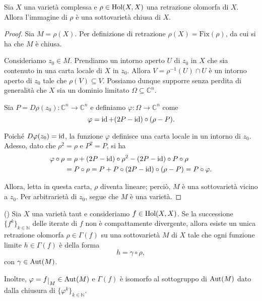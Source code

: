 \begin{lm}
    Sia $X$ una varietà complessa e $\rho\in\textnormal{Hol}(X,X)$ una retrazione olomorfa di $X$. Allora l'immagine di $\rho$ è una sottovarietà chiusa di $X$.
\end{lm}
\begin{proof}
    Sia $M=\rho(X)$. Per definizione di retrazione $\rho(X)=\text{Fix}(\rho)$, da cui si ha che $M$ è chiusa.
    
    Consideriamo $z_0 \in M$. Prendiamo un intorno aperto $U$ di $z_0$ in $X$ che sia contenuto in una carta locale di $X$ in $z_0$. Allora $V=\rho^{-1}(U)\cap U$ è un intorno aperto di $z_0$ tale che $\rho(V) \subseteq V$. Possiamo dunque supporre senza perdita di generalità che $X$ sia un dominio limitato $\Omega\subseteq\mathbb{C}^n$.

    Sia $P=D\rho(z_0):\mathbb{C}^n \longrightarrow \mathbb{C}^n$ e definiamo $\varphi:\Omega \longrightarrow \mathbb{C}^n$ come
    $$\varphi=\operatorname{id}+(2P-\operatorname{id})\circ(\rho-P).$$

    Poiché $D\varphi(z_0)=\operatorname{id}$, la funzione $\varphi$ definisce una carta locale in un intorno di $z_0$. Adesso, dato che $\rho^2=\rho$ e $P^2=P$, si ha
    \begin{align*}
        \varphi\circ\rho&=\rho+(2P-\operatorname{id})\circ\rho^2-(2P-\operatorname{id})\circ P\circ\rho\\
        &=P\circ\rho=P+P\circ(2P-\operatorname{id})\circ(\rho-P)=P\circ\varphi.
    \end{align*}

    Allora, letta in questa carta, $\rho$ diventa lineare; perciò, $M$ è una sottovarietà vicino a $z_0$. Per arbitrarietà di $z_0$, segue che $M$ è una varietà.
\end{proof}

\begin{thm} \label{retraiii}
    (\cite[Theorem 2.1.29]{A1}) Sia $X$ una varietà taut e consideriamo $f\in\textnormal{Hol}(X,X)$. Se la successione $\{f^k\}_{k\in\mathbb{N}}$ delle iterate di $f$ non è compattamente divergente, allora esiste un unica retrazione olomorfa $\rho\in\Gamma(f)$ su una sottovarietà $M$ di $X$ tale che ogni funzione limite $h\in\Gamma(f)$ è della forma
    $$h=\gamma\circ\rho,$$
    con $\gamma\in\textnormal{Aut}(M)$.

    Inoltre, $\varphi=f\restrict{M}\in\textnormal{Aut}(M)$ e $\Gamma(f)$ è isomorfo al sottogruppo di $\textnormal{Aut}(M)$ dato dalla chiusura di $\{\varphi^k\}_{k \in\mathbb{N}}$.
\end{thm}

